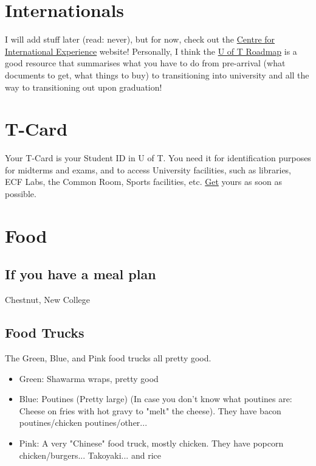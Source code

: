 \section{Internationals}

I will add stuff later (read: never), but for now, check out the \href{https://internationalexperience.utoronto.ca/}{Centre for International Experience} website! Personally, I think the \href{https://internationalexperience.utoronto.ca/international-student-services/resource-and-information-hub/ise-roadmap/}{U of T Roadmap} is a good resource that summarises what you have to do from pre-arrival (what documents to get, what things to buy) to transitioning into university and all the way to transitioning out upon graduation!

\section{T-Card}

Your T-Card is your Student ID in U of T. You need it for identification purposes for midterms and exams, and to access University facilities, such as libraries, ECF Labs, the Common Room, Sports facilities, etc. \href{https://tcard.utoronto.ca/get-your-utorid-tcard/}{Get} yours as soon as possible.

\section{Food}

\subsection{If you have a meal plan}

Chestnut, New College

\subsection{Food Trucks}

The Green, Blue, and Pink food trucks all pretty good. 

\begin{itemize}
    \item Green: Shawarma wraps, pretty good
    \item Blue: Poutines (Pretty large) (In case you don't know what poutines are: Cheese on fries with hot gravy to "melt" the cheese). They have bacon poutines/chicken poutines/other...
    \item Pink: A very "Chinese" food truck, mostly chicken. They have popcorn chicken/burgers... Takoyaki... and rice
\end{itemize}

